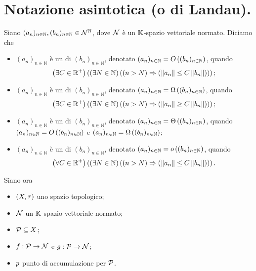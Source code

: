 \section{Notazione asintotica (o di Landau).}
\label{TeoriaDelleSuccessioniEDelleSerie_NotazioneAsintotica}
\begin{Definition}
	 Siano $(a_n)_{n \in \mathbb{N}}, (b_n)_{n \in \mathbb{N}} \in \mathbb{\mathcal{N}}^\mathbb{N}$, dove $\mathcal{N}$ \`e un $\mathbb{K}$-spazio vettoriale normato. Diciamo che
	\begin{itemize}
		\item $(a_n)_{n \in \mathbb{N}}$ \`e un  di $(b_n)_{n \in \mathbb{N}}$, denotato $(a_n)_{n \in \mathbb{N}} = O \left ( (b_n)_{n \in \mathbb{N}} \right )$, quando $$\Exists{C \in \RealPositive}{\Exists{N \in \mathbb{N}}{\Implies{n > N}{\Norm{a_n} \leq C \Norm{b_n}}}};$$
		\item $(a_n)_{n \in \mathbb{N}}$ \`e un  di $(b_n)_{n \in \mathbb{N}}$, denotato $(a_n)_{n \in \mathbb{N}} = \Omega \left ( (b_n)_{n \in \mathbb{N}} \right )$, quando $$\Exists{C \in \RealPositive}{\Exists{N \in \mathbb{N}}{\Implies{n > N}{\Norm{a_n} \geq C \Norm{b_n}}}};$$
		\item $(a_n)_{n \in \mathbb{N}}$ \`e un  di $(b_n)_{n \in \mathbb{N}}$, denotato $(a_n)_{n \in \mathbb{N}} = \Theta \left ( (b_n)_{n \in \mathbb{N}} \right )$, quando $(a_n)_{n \in \mathbb{N}} = O \left ( (b_n)_{n \in \mathbb{N}} \right )$ e $(a_n)_{n \in \mathbb{N}} = \Omega \left ( (b_n)_{n \in \mathbb{N}} \right )$;
		\item $(a_n)_{n \in \mathbb{N}}$ \`e un  di $(b_n)_{n \in \mathbb{N}}$, denotato $(a_n)_{n \in \mathbb{N}} = o \left ( (b_n)_{n \in \mathbb{N}} \right )$, quando $$\ForAll{C \in \RealPositive}{\Exists{N \in \mathbb{N}}{\Implies{n > N}{\Norm{a_n} \leq C \Norm{b_n}}}}.$$
	\end{itemize}
	\par Siano ora
	\begin{itemize}
		\item $(X,\tau)$ uno spazio topologico;
		\item $\mathcal{N}$ un $\mathbb{K}$-spazio vettoriale normato;
		\item $\mathcal{P} \subseteq X$;
		\item $f: \mathcal{P} \rightarrow \mathcal{N}$ e $g: \mathcal{P} \rightarrow \mathcal{N}$;
		\item $p$ punto di accumulazione per $\mathcal{P}$.

\end{itemize}
\end{Definition}
